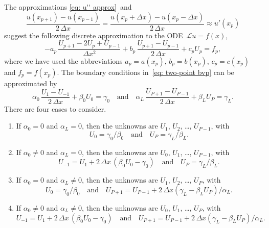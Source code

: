 The approximations \eqref{eq: u'' approx}~and
\[
\frac{u(x_{p+1})-u(x_{p-1})}{2\,\Delta x}
	=\frac{u(x_p+\Delta x)-u(x_p-\Delta x)}{2\,\Delta x}
	\approx u'(x_p)
\]
suggest the following discrete approximation to the ODE~$\mathcal{L}u=f(x)$,
\begin{equation}\label{eq: Lu=f finite diff}
-a_p\,\frac{U_{p+1}-2U_p+U_{p-1}}{\Delta x^2}
	+b_p\,\frac{U_{p+1}-U_{p-1}}{2\,\Delta x}+c_pU_p=f_p,
\end{equation}
where we have used the abbreviations $a_p=a(x_p)$, $b_p=b(x_p)$, $c_p=c(x_p)$
and $f_p=f(x_p)$.  The boundary conditions in~\eqref{eq: two-point bvp} can be 
approximated by
\begin{equation}\label{eq: bc finite diff 1d}
\alpha_0\,\frac{U_1-U_{-1}}{2\,\Delta x}+\beta_0U_0=\gamma_0
\quad\text{and}\quad
\alpha_L\,\frac{U_{P+1}-U_{P-1}}{2\,\Delta x}+\beta_LU_P=\gamma_L.
\end{equation}
There are four cases to consider.
\begin{enumerate}
\item If $\alpha_0=0$ and $\alpha_L=0$, then the unknowns are
$U_1$, $U_2$, \dots, $U_{P-1}$, with
\[
U_0=\gamma_0/\beta_0\quad\text{and}\quad U_P=\gamma_L/\beta_L.
\]
\item If $\alpha_0\ne0$ and $\alpha_L=0$, then the unknowns are
$U_0$, $U_1$, \dots, $U_{P-1}$, with 
\[
U_{-1}=U_1+2\,\Delta x\,(\beta_0U_0-\gamma_0)\quad\text{and}\quad
U_P=\gamma_L/\beta_L.
\]
\item If $\alpha_0=0$ and $\alpha_L\ne0$, then the unknowns are
$U_1$, $U_2$, \dots, $U_P$, with 
\[
U_0=\gamma_0/\beta_0\quad\text{and}\quad
U_{P+1}=U_{P-1}+2\,\Delta x(\gamma_L-\beta_LU_P)/\alpha_L.
\]
\item If $\alpha_0\ne0$ and $\alpha_L\ne0$, then the unknowns are
$U_0$, $U_1$, \dots, $U_P$, with
\[ 
U_{-1}=U_1+2\,\Delta x\,(\beta_0U_0-\gamma_0)\quad\text{and}\quad
U_{P+1}=U_{P-1}+2\,\Delta x(\gamma_L-\beta_LU_P)/\alpha_L.
\]
\end{enumerate}

